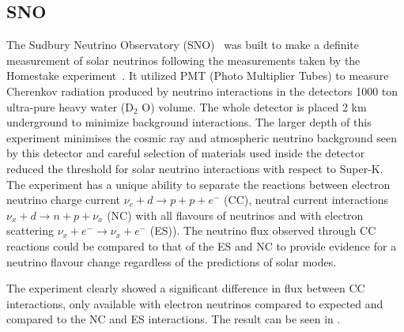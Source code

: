 
\subsection{SNO}

The Sudbury Neutrino Observatory (SNO)~\cite{Fix6} was built to make a definite measurement of solar neutrinos following the measurements taken by the Homestake experiment~\cite{9Davis}. It utilized PMT (Photo Multiplier Tubes) to measure Cherenkov radiation produced by neutrino interactions in the detectors 1000 ton ultra-pure heavy water (D$_2$ O) volume. The whole detector is placed 2 km underground to minimize background interactions. The larger depth of this experiment minimises the cosmic ray and atmospheric neutrino background seen by this detector and careful selection of materials used inside the detector reduced the threshold for solar neutrino interactions with respect to Super-K. The experiment has a unique ability to separate the reactions between electron neutrino charge current $\nu_e + d \rightarrow p + p + e^-$ (CC), neutral current interactions $\nu_x + d \rightarrow n + p + \nu_x$ (NC) with all flavours of neutrinos and with electron scattering $\nu_x + e^- \rightarrow \nu_x + e^-$ (ES)). The neutrino flux observed through CC reactions could be compared to that of the ES  and NC to provide evidence for a neutrino flavour change regardless of the predictions of solar modes.

The experiment clearly showed a significant difference in flux between CC interactions, only available with electron neutrinos compared to expected and compared to the NC and ES interactions. The result can be seen in .

